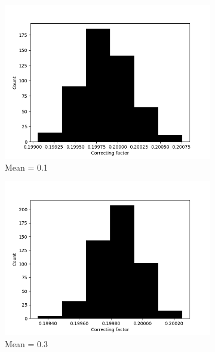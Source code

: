     \begin{figure}
      \begin{subfigure}[t]{0.45\textwidth}
        \centering
        \includegraphics[width=1\textwidth]{./images/robust_approx/results_2d_high_rank_figures/correcting_factors_hadamard_std_10_01.png}
        \caption{Mean = 0.1}
      \end{subfigure}
      \begin{subfigure}[t]{0.45\textwidth}
        \centering
        \includegraphics[width=1\textwidth]{./images/robust_approx/results_2d_high_rank_figures/correcting_factors_hadamard_std_10_03.png}
        \caption{Mean = 0.3}
      \end{subfigure}
      \begin{subfigure}[t]{0.45\textwidth}

\end{subfigure}
\end{figure}
